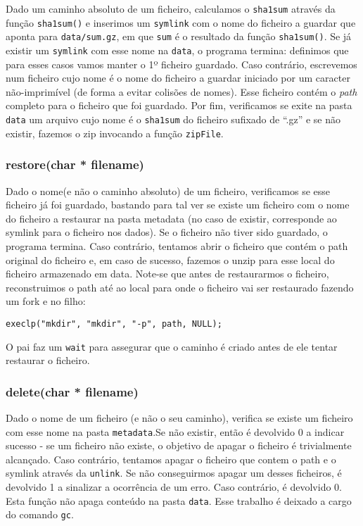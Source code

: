 \documentclass[a4paper,12pt,titlepage,portuguese]{article}
\begin{document}
Dado um caminho absoluto de um ficheiro, calculamos o \texttt{sha1sum} através da função \texttt{sha1sum()} e inserimos um \texttt{symlink} com o nome do ficheiro a guardar que aponta para \texttt{data/sum.gz}, em que \texttt{sum} é o resultado da função \texttt{sha1sum()}. Se já existir um \texttt{symlink} com esse nome na \texttt{data}, o programa termina: definimos que para esses casos vamos manter o 1º ficheiro guardado. Caso contrário, escrevemos num ficheiro cujo nome é o nome do ficheiro a guardar iniciado por um caracter não-imprimível (de forma a evitar colisões de nomes). Esse ficheiro contém o \emph{path} completo para o ficheiro que foi guardado. Por fim, verificamos se exite na pasta \texttt{data} um arquivo cujo nome é o \texttt{sha1sum} do ficheiro sufixado de ``.gz'' e se não existir, fazemos o zip invocando a função \texttt{zipFile}.

\subsubsection{restore(char * filename)}

Dado o nome(e não o caminho absoluto) de um ficheiro, verificamos se esse ficheiro já foi guardado, bastando para tal ver se existe um ficheiro com o nome do ficheiro a restaurar na pasta metadata (no caso de existir, corresponde ao symlink para o ficheiro nos dados). Se o ficheiro não tiver sido guardado, o programa termina. Caso contrário, tentamos abrir o ficheiro que contém o path original do ficheiro e, em caso de sucesso, fazemos o unzip para esse local do ficheiro 
armazenado em data. Note-se que antes de restaurarmos o ficheiro, reconstruimos o path até ao local para onde o ficheiro vai ser restaurado fazendo um fork e no filho:
\begin{verbatim}
execlp("mkdir", "mkdir", "-p", path, NULL);
\end{verbatim}

O pai faz um \texttt{wait} para assegurar que o caminho é criado antes de ele tentar restaurar o ficheiro.

\subsubsection{delete(char * filename)}

Dado o nome de um ficheiro (e não o seu caminho), verifica se existe um ficheiro com esse nome na pasta \texttt{metadata}.Se não existir, então é devolvido 0 a indicar sucesso - se um ficheiro não existe, o objetivo de apagar o ficheiro é trivialmente alcançado. Caso contrário, tentamos apagar o ficheiro que contem o path e o symlink através da \texttt{unlink}. Se não conseguirmos apagar um desses ficheiros, é devolvido 1 a sinalizar a ocorrência de um erro. Caso contrário, é devolvido 0. Esta função não apaga conteúdo na pasta \texttt{data}. Esse trabalho é deixado a cargo do comando \texttt{gc}.
\end{document}
